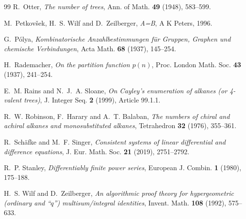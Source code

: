 \documentclass[11pt]{article}
\theoremstyle{definition}
\begin{document}
\begin{thebibliography}{99}
R.~Otter,
\emph{The number of trees},
Ann. of Math. \textbf{49} (1948), 583--599.

M.~Petkov\v{s}ek, H.~S. Wilf and D.~Zeilberger,
\emph{A=B},
A K Peters, 1996.

G.~P\'olya,
\emph{Kombinatorische Anzahlbestimmungen f\"ur Gruppen, Graphen und chemische
Verbindungen},
Acta Math. \textbf{68} (1937), 145--254.

H.~Rademacher,
\emph{On the partition function $p(n)$},
Proc. London Math. Soc. \textbf{43} (1937), 241--254.

E.~M. Rains and N.~J.~A. Sloane,
\emph{On Cayley's enumeration of alkanes (or 4-valent trees)},
J. Integer Seq. \textbf{2} (1999), Article 99.1.1.

R.~W. Robinson, F.~Harary and A.~T. Balaban,
\emph{The numbers of chiral and achiral alkanes and monosubstituted alkanes},
Tetrahedron \textbf{32} (1976), 355--361.

R.~Sch\"afke and M.~F. Singer,
\emph{Consistent systems of linear differential and difference equations},
J. Eur. Math. Soc. \textbf{21} (2019), 2751--2792.

R.~P. Stanley,
\emph{Differentiably finite power series},
European J. Combin. \textbf{1} (1980), 175--188.

H.~S. Wilf and D.~Zeilberger,
\emph{An algorithmic proof theory for hypergeometric (ordinary and ``$q$'')
multisum/integral identities},
Invent. Math. \textbf{108} (1992), 575--633.

\end{thebibliography}
\end{document}

